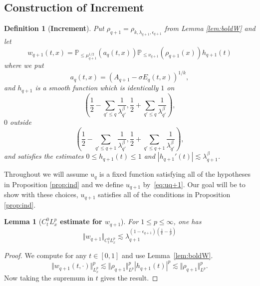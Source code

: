 \documentclass[12pt,reqno,letterpaper]{amsart}
\numberwithin{equation}{section}
\newcommand{\1}{{\bf 1}}
\newcommand{\2}{{\bf 2}}
\newcommand{\norm}[1]{ \Vert #1 \Vert}
\newtheorem{definition}[theorem]{Definition}
\newtheorem{lemma}[theorem]{Lemma}
\theoremstyle{remark}
\theoremstyle{remark}
\begin{document}
\subsection{Construction of Increment}

\begin{definition}[\textbf{Increment}]\label{def:wq+1}
    Put $\rho_{q+1} = \rho_{k,\lambda_{q+1},\epsilon_{q+1}}$ from Lemma \ref{lem:boldW} and let
    \begin{equation}\label{eq:wq+1}
        w_{q+1}(t, x) = \mathbb{P}_{\leq \mu_{q+1}^{1/2}} \left(a_{q}(t,x) \right) \mathbb{P}_{\leq \nu_{q+1}}\left(\rho_{q+1}(x)\right) h_{q+1}(t)
    \end{equation}
    where we put
    \begin{equation}\label{eq:ak}
        a_{q}(t,x) = \left(A_{q+1} - \sigma E_q(t,x)\right)^{1/k},
    \end{equation}
    and $h_{q+1}$ is a smooth function which is identically $1$ on
    $$
    \left(\frac{1}{2}- \sum_{q'\leq q} \frac{1}{\lambda_{q'}^\beta},\frac{1}{2} + \sum_{q' \leq q} \frac{1}{\lambda_{q'}^\beta}\right),
    $$
    $0$ outside
    $$
    \left(\frac{1}{2}- \sum_{q'\leq q+1} \frac{1}{\lambda_{q'}^\beta},\frac{1}{2} + \sum_{q' \leq q+1} \frac{1}{\lambda_{q'}^\beta}\right),
    $$
    and satisfies the estimates $0 \leq h_{q+1}(t) \leq 1$ and  $|h_{q+1}'(t)| \lesssim \lambda_{q+1}^\beta$.
\end{definition}

Throughout we will assume $u_q$ is a fixed function satisfying all of the hypotheses in Proposition \ref{prop:ind} and we define $u_{q+1}$ by~\eqref{eq:uq+1}. Our goal will be to show with these choices, $u_{q+1}$ satisfies all of the conditions in Proposition \ref{prop:ind}.




\begin{lemma}[\textbf{$C_t^0 L_x^p$ estimate for $w_{q+1}$}]\label{lem:wq+1_est}
    For $1 \leq p \leq \infty$, one has 
    \begin{equation*}
        \norm{w_{q+1}}_{C_t^0 L_x^p} \lesssim \lambda_{q+1}^{(1 - \epsilon_{q+1}) (\frac{1}{k} - \frac{1}{p})}
    \end{equation*}
\end{lemma}
\begin{proof}
    We compute for any $t \in [0, 1]$ and use Lemma~\ref{lem:boldW}.
    \[\norm{w_{q+1}(t, \cdot)}_{ L_x^p}^p \lesssim \norm{\rho_{q+1}}_{L^p}^p |h_{q+1}(t)|^p \lesssim \norm{\rho_{q+1}}_{L^p}^p. \]
    Now taking the supremum in $t$ gives the result.
\end{proof}
\end{document}
